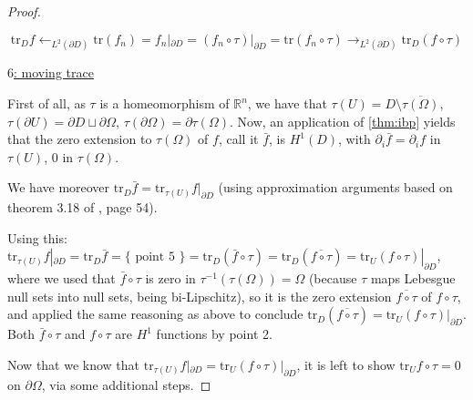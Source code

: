 \documentclass[english,a4paper,9pt,oneside]{scrbook}	%
\theoremstyle{break}
\newenvironment{mproof}[1][\proofname]{%
  \begin{proof}[#1]$ $\par\nobreak\ignorespaces
}{%
  \end{proof}
}
\renewcommand*{\proofname}{Proof}
\theoremstyle{remark}
\newcommand{\mR}{\mathbb{R}}
\newcommand{\tr}{\text{tr}}
\newcommand{\ind}[1]{\{\text{ #1 }\}}
\begin{document}
\begin{appendices}
\begin{mproof}
$$\tr_D f \leftarrow_{L^2(\partial D)}\tr(f_n) = f_n|_{\partial D} = (f_n\circ \tau)|_{\partial D}= \tr(f_n \circ \tau)\rightarrow_{L^2(\partial D)} \tr_D(f \circ \tau)$$

\underline{$6$: moving trace}

First of all, as $\tau$ is a homeomorphism of $\mR^{n}$, we have that $\tau (U)=D\setminus \overline{\tau(\Omega)}$, $\tau(\partial U) = \partial D \sqcup \partial \Omega$, $\tau(\partial \Omega) = \partial \tau (\Omega)$.
%
Now, an application of \cref{thm:ibp} yields that the zero extension to $\tau(\Omega)$ of $f$, call it $\bar{f}$, is $H^1(D)$, with $\partial_i \bar{f}=\partial_i f$ in $\tau( U)$, $0$ in $\tau(\Omega)$.

We have moreover $\tr_D \bar{f} = \tr_{\tau(U)} f|_{\partial D}$ (using approximation arguments based on theorem 3.18 of \cite{adams}, page 54).

Using this: $ \tr_{\tau(U)}f|_{\partial D} = \tr_D \bar{f} = \ind{point 5} = \tr_D(\bar{f}\circ \tau) = \tr_D(\overline{f \circ \tau}) = \tr_U (f\circ \tau)|_{\partial D}$, where we used that $\bar{f}\circ \tau$ is zero in $\tau^{-1}(\tau(\Omega)) = \Omega$ (because $\tau$ maps Lebesgue null sets into null sets, being bi-Lipschitz), so it is the zero extension $\overline{f \circ \tau}$ of $f\circ \tau$, and applied the same reasoning as above to conclude $\tr_D(\overline{f \circ \tau}) = \tr_U (f\circ \tau)|_{\partial D}$. Both $\bar{f}\circ \tau$ and $f\circ \tau$ are $H^1$ functions by point 2.

Now that we know that $ \tr_{\tau(U)}f|_{\partial D}  = \tr_U (f\circ \tau)|_{\partial D}$, it is left to show $\tr_U f\circ \tau=0 $ on $\partial \Omega$, via some additional steps.

%


\end{mproof}
\end{appendices}
\end{document}
